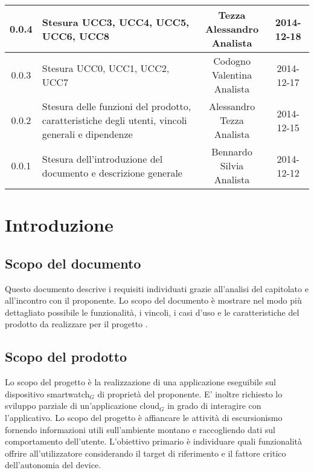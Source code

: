 \begin{center}
\begin{tabularx}{\textwidth}{cXcc}
0.0.4 & Stesura UCC3, UCC4, UCC5, UCC6, UCC8 & \multicell{Tezza Alessandro \\ Analista} & 2014-12-18 \\\midrule
0.0.3 & Stesura UCC0, UCC1, UCC2, UCC7 & \multicell{Codogno Valentina \\ Analista} & 2014-12-17 \\\midrule
0.0.2 & Stesura delle funzioni del prodotto, caratteristiche degli utenti, vincoli generali e dipendenze & \multicell{Alessandro Tezza \\ Analista} & 2014-12-15 \\\midrule
0.0.1 & Stesura dell'introduzione del documento e descrizione generale & \multicell{Bennardo Silvia \\ Analista} & 2014-12-12 \\



\bottomrule
\end{tabularx}
\end{center}
\newpage



\section{Introduzione}
\subsection{Scopo del documento}
Questo documento descrive i requisiti individuati grazie all'analisi del capitolato e all'incontro con il proponente. Lo scopo del documento è mostrare nel modo più dettagliato possibile le funzionalità, i vincoli, i casi d'uso e le caratteristiche del prodotto da realizzare per il progetto \CAPITOLATO{}.

\subsection{Scopo del prodotto}
Lo scopo del progetto è la realizzazione di una applicazione eseguibile sul dispositivo smartwatch$_{G}$ di proprietà del proponente. E’ inoltre richiesto lo sviluppo parziale di un’applicazione cloud$_{G}$ in grado di interagire con l’applicativo. Lo scopo del progetto è affiancare le attività di escursionismo fornendo informazioni utili sull’ambiente montano e raccogliendo dati sul comportamento dell’utente. L’obiettivo primario è individuare quali funzionalità offrire all’utilizzatore considerando il target di riferimento e il fattore critico dell’autonomia del device.

